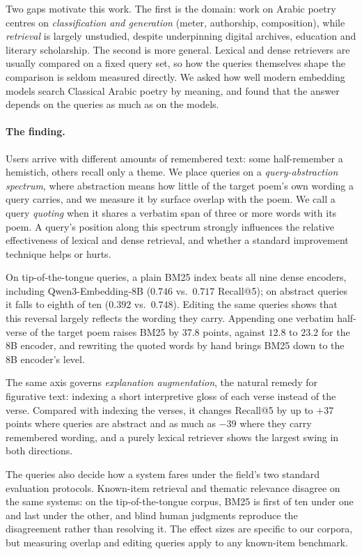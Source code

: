 \documentclass[11pt]{article}
\begin{document}
Two gaps motivate this work. The first is the domain: work on Arabic poetry centres on \emph{classification and generation} (meter, authorship, composition), while \emph{retrieval} is largely unstudied, despite underpinning digital archives, education and literary scholarship. The second is more general. Lexical and dense retrievers are usually compared on a fixed query set, so how the queries themselves shape the comparison is seldom measured directly. We asked how well modern embedding models search Classical Arabic poetry by meaning, and found that the answer depends on the queries as much as on the models.

\paragraph{The finding.} Users arrive with different amounts of remembered text: some half-remember a hemistich, others recall only a theme. We place queries on a \emph{query-abstraction spectrum}, where abstraction means how little of the target poem's own wording a query carries, and we measure it by surface overlap with the poem. We call a query \emph{quoting} when it shares a verbatim span of three or more words with its poem. A query's position along this spectrum strongly influences the relative effectiveness of lexical and dense retrieval, and whether a standard improvement technique helps or hurts.

On tip-of-the-tongue queries, a plain BM25 index beats all nine dense encoders, including Qwen3-Embedding-8B ($0.746$ vs.\ $0.717$ Recall@5); on abstract queries it falls to eighth of ten ($0.392$ vs.\ $0.748$). Editing the same queries shows that this reversal largely reflects the wording they carry. Appending one verbatim half-verse of the target poem raises BM25 by $37.8$ points, against $12.8$ to $23.2$ for the 8B encoder, and rewriting the quoted words by hand brings BM25 down to the 8B encoder's level.

The same axis governs \emph{explanation augmentation}, the natural remedy for figurative text: indexing a short interpretive gloss of each verse instead of the verse. Compared with indexing the verses, it changes Recall@5 by up to $+37$ points where queries are abstract and as much as $-39$ where they carry remembered wording, and a purely lexical retriever shows the largest swing in both directions.

The queries also decide how a system fares under the field's two standard evaluation protocols. Known-item retrieval and thematic relevance disagree on the same systems: on the tip-of-the-tongue corpus, BM25 is first of ten under one and last under the other, and blind human judgments reproduce the disagreement rather than resolving it. The effect sizes are specific to our corpora, but measuring overlap and editing queries apply to any known-item benchmark.
\end{document}
